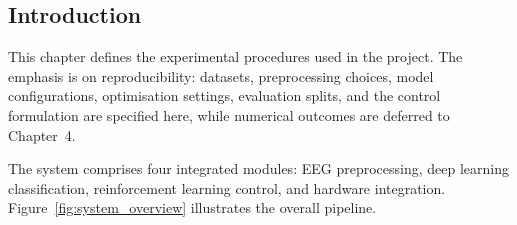 \documentclass[12pt, a4paper]{article}
\begin{document}
\subsection{Introduction}

This chapter defines the experimental procedures used in the project. The emphasis is on reproducibility: datasets, preprocessing choices, model configurations, optimisation settings, evaluation splits, and the control formulation are specified here, while numerical outcomes are deferred to Chapter~4.

The system comprises four integrated modules: EEG preprocessing, deep learning classification, reinforcement learning control, and hardware integration. Figure~\ref{fig:system_overview} illustrates the overall pipeline.
\end{document}
